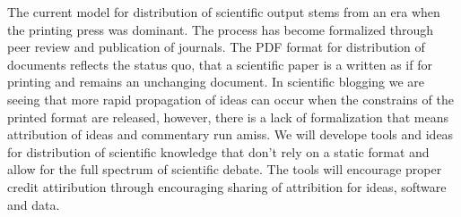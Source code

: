 \begin{workpackage}[id=social-aspects,wphases=1-48!.5,
  title=Social Aspects,
  lead=UO,
  UORM=1,USHRM=8]

\begin{tasklist}
\begin{task}[title=Modern Distribution of Scientific Output]
  The current model for distribution of scientific output stems from an era when the printing press was dominant. The process has become formalized through peer review and publication of journals. The PDF format for distribution of documents reflects the status quo, that a scientific paper is a written as if for printing and remains an unchanging document. In scientific blogging we are seeing that more rapid propagation of ideas can occur when the constrains of the printed format are released, however, there is a lack of formalization that means attribution of ideas and commentary run amiss. We will develope tools and ideas for distribution of scientific knowledge that don't rely on a static format and allow for the full spectrum of scientific debate. The tools will encourage proper credit attiribution through encouraging sharing of attribition for ideas, software and data.
\end{task}


\end{tasklist}
\end{workpackage}
